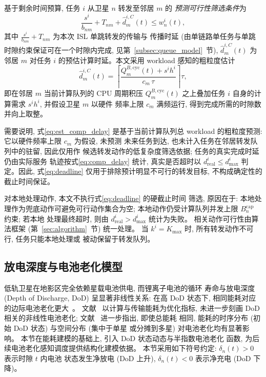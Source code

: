 \documentclass[a4paper,11pt]{article}
\begin{document}
基于剩余时间预算, 任务 $i$ 从卫星 $n$ 转发至邻居 $m$ 的
\emph{预测可行性筛选条件}为
\begin{equation}
    \frac{s^i}{b_{nm}} + T_{nm} + \hat{d}^{i,C}_m(t)
    \le w^i_n(t),
    \label{eq:deadline}
\end{equation}
其中 $\frac{s^i}{b_{nm}} + T_{nm}$ 为本次 ISL 单跳转发的传输与
传播时延 (由单链路单任务与单跳时隙约束保证可在一个时隙内完成,
见第~\ref{subsec:queue_model}~节), $\hat{d}^{i,C}_m(t)$ 为邻居 $m$
对任务 $i$ 的预估计算时延。本文采用 workload 感知的粗粒度估计
\begin{equation}
    \hat{d}^{i,C}_m(t) = \left\lceil
    \frac{Q^{B,\mathrm{cyc}}_m(t) + s^i h^i}{c_m\, \tau}
    \right\rceil \tau,
    \label{eq:est_comp_delay}
\end{equation}
即在邻居 $m$ 当前计算队列的 CPU 周期积压 $Q^{B,\mathrm{cyc}}_m(t)$
之上叠加任务 $i$ 自身的计算需求 $s^i h^i$, 并假设卫星 $m$ 以硬件
频率上限 $c_m$ 满频运行, 得到完成所需的时隙数并向上取整。

需要说明, 式\eqref{eq:est_comp_delay} 是基于当前计算队列总
workload 的粗粒度预测: 它以硬件频率上限 $c_m$ 为假设, 未预测
未来任务到达, 也未计入任务在邻居转发队列中的驻留, 因此仅用作
候选转发动作的低复杂度筛选依据; 任务的真实完成时延仍由实际服务
轨迹按式\eqref{eq:comp_delay} 统计, 真实是否超时以
$d^i_{\mathrm{real}} \le d^i_{\max}$ 判定。因此, 式\eqref{eq:deadline}
仅用于排除预计明显不可行的转发目标, 不构成确定性的截止时间保证。

对本地处理动作, 本文不执行式\eqref{eq:deadline} 的硬截止时间
筛选, 原因在于: 本地处理作为兜底动作可避免可行动作集合为空;
本地动作仍受计算队列并发上限 $B^{\mathrm{cap}}_n$ 约束; 若本地
处理最终超时, 则由 $d^i_{\mathrm{real}} > d^i_{\max}$ 统计为失败。
相关动作可行性由算法框架 (第~\ref{sec:algorithm}~节) 统一处理。
当 $k^i = K_{\max}$ 时, 所有转发动作不可行, 任务只能本地处理或
被动保留于转发队列。
\subsection{放电深度与电池老化模型}
\label{subsec:battery}

低轨卫星在地影区完全依赖星载电池供电, 而锂离子电池的循环
寿命与放电深度 (Depth of Discharge, DoD) 呈显著非线性关系:
在高 DoD 状态下, 相同能耗对应的边际电池老化更大~\cite{yang2016energy,li2024battery,chen2025tasri}。
文献~\cite{zhang2024mhspo} 以计算与传输能耗为优化指标, 
未进一步刻画 DoD 相关的非线性电池老化;
文献~\cite{li2024battery,chen2025tasri} 进一步指出, 即使总能耗
相同, 能耗的时序分布 (初始 DoD 状态) 与空间分布 (集中于单星
或分摊到多星) 对电池老化均有显著影响。
本节在能耗建模的基础上, 引入 DoD 状态动态与半指数电池老化
函数, 为后续电池老化感知调度提供结构化建模依据。
本节采用如下符号约定: $\delta_n(t) > 0$ 表示时隙 $t$ 内电池
状态发生净放电 (DoD 上升), $\delta_n(t) < 0$ 表示净充电
(DoD 下降)。
\end{document}

